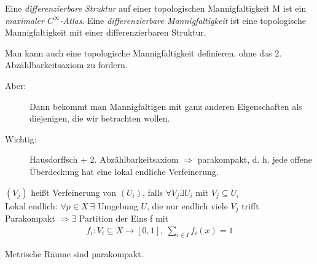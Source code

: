 \begin{defs}
Eine \textit{differenzierbare Struktur} auf einer topologischen Mannigfaltigkeit M ist ein \textit{maximaler $C^\infty$-Atlas}. Eine \textit{differenzierbare Mannigfaltigkeit} ist eine topologische Mannigfaltigkeit mit einer differenzierbaren Struktur.
\end{defs}

\begin{bem}
Man kann auch eine topologische Mannigfaltigkeit definieren, ohne das 2. Abzählbarkeitsaxiom zu fordern.
\begin{description}
\item[Aber:] Dann bekommt man Mannigfaltigen mit ganz anderen Eigenschaften als diejenigen, die wir betrachten wollen.
\item[Wichtig:] Hausdorffsch + 2. Abzählbarkeitsaxiom $\Rightarrow$ parakompakt, d. h. jede offene Überdeckung hat eine lokal endliche Verfeinerung.
\end{description}
$(V_j)$ heißt Verfeinerung von $(U_i)$, falls $\forall V_j \exists U_i$ mit $V_j \subseteq U_i$\\
Lokal endlich: $\forall p \in X\ \exists$ Umgebung $U$, die nur endlich viele $V_j$ trifft\\
Parakompakt $\Rightarrow \exists$ Partition der Eins f mit 
\begin{align*}
f_i: V_i \subseteq X \rightarrow [0, 1],\ \sum_{i \in I} f_i (x) = 1
\end{align*} 
\end{bem}

\begin{bsp}
Metrische Räume sind parakompakt.
\end{bsp}

